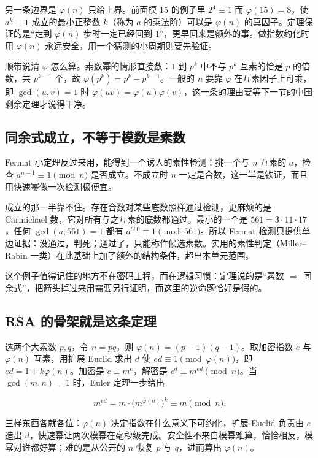 另一条边界是 \(\varphi(n)\) 只给上界。前面模 15 的例子里 \(2^{4}\equiv1\) 而 \(\varphi(15)=8\)，使 \(a^{k}\equiv1\) 成立的最小正整数 \(k\)（称为 \(a\) 的乘法阶）可以是 \(\varphi(n)\) 的真因子。定理保证的是``走到 \(\varphi(n)\) 步时一定已经回到 1''，更早回来是额外的事。做指数约化时用 \(\varphi(n)\) 永远安全，用一个猜测的小周期则要先验证。

顺带说清 \(\varphi\) 怎么算。素数幂的情形直接数：\(1\) 到 \(p^{k}\) 中不与 \(p^{k}\) 互素的恰是 \(p\) 的倍数，共 \(p^{k-1}\) 个，故 \(\varphi(p^{k})=p^{k}-p^{k-1}\)。一般的 \(n\) 要靠 \(\varphi\) 在互素因子上可乘，即 \(\gcd(u,v)=1\) 时 \(\varphi(uv)=\varphi(u)\varphi(v)\)，这一条的理由要等下一节的中国剩余定理才说得干净。

\subsection{同余式成立，不等于模数是素数}

Fermat 小定理反过来用，能得到一个诱人的素性检测：挑一个与 \(n\) 互素的 \(a\)，检查 \(a^{n-1}\equiv1\pmod n\) 是否成立。不成立时 \(n\) 一定是合数，这一半是铁证，而且用快速幂做一次检测极便宜。

成立的那一半靠不住。存在合数对某些底数照样通过检测，更麻烦的是 Carmichael 数，它对所有与之互素的底数都通过。最小的一个是 \(561=3\cdot11\cdot17\)，任何 \(\gcd(a,561)=1\) 都有 \(a^{560}\equiv1\pmod{561}\)。所以 Fermat 检测只提供单边证据：没通过，判死；通过了，只能称作候选素数。实用的素性判定（Miller--Rabin 一类）在此基础上加了额外的结构条件，超出本单元范围。

这个例子值得记住的地方不在密码工程，而在逻辑习惯：定理说的是``素数 \(\Rightarrow\) 同余式''，把箭头掉过来用需要另行证明，而这里的逆命题恰好是假的。

\subsection{RSA 的骨架就是这条定理}

选两个大素数 \(p,q\)，令 \(n=pq\)，则 \(\varphi(n)=(p-1)(q-1)\)。取加密指数 \(e\) 与 \(\varphi(n)\) 互素，用扩展 Euclid 求出 \(d\) 使 \(ed\equiv1\pmod{\varphi(n)}\)，即 \(ed=1+k\varphi(n)\)。加密是 \(c\equiv m^{e}\)，解密是 \(c^{d}\equiv m^{ed}\pmod n\)。当 \(\gcd(m,n)=1\) 时，Euler 定理一步给出

\[
m^{ed}=m\cdot\bigl(m^{\varphi(n)}\bigr)^{k}\equiv m\pmod n.
\]

三样东西各就各位：\(\varphi(n)\) 决定指数在什么意义下可约化，扩展 Euclid 负责由 \(e\) 造出 \(d\)，快速幂让两次模幂在毫秒级完成。安全性不来自模幂难算，恰恰相反，模幂对谁都好算；难的是从公开的 \(n\) 恢复 \(p\) 与 \(q\)，进而算出 \(\varphi(n)\)。

